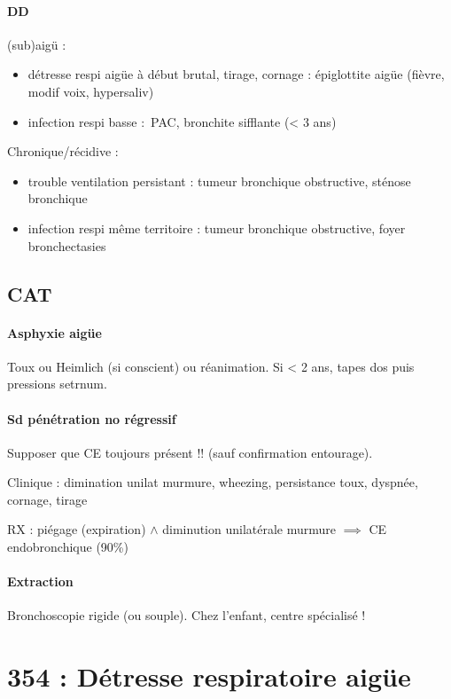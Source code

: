 \documentclass{article}
\begin{document}
\paragraph{DD}
(sub)aigü : 
\begin{itemize}
\item détresse respi aigüe à début brutal, tirage, cornage : épiglottite aigüe
  (fièvre, modif voix, hypersaliv)
\item infection respi basse : PAC, bronchite sifflante (< 3 ans)
\end{itemize}
Chronique/récidive :
\begin{itemize}
\item trouble ventilation persistant : tumeur bronchique obstructive, sténose
  bronchique
\item infection respi même territoire : tumeur bronchique obstructive, foyer
  bronchectasies
\end{itemize}

\subsection{CAT}
\paragraph{Asphyxie aigüe}
Toux ou Heimlich (si conscient) ou réanimation. Si < 2 ans, tapes dos puis
pressions setrnum.
\paragraph{Sd pénétration no régressif}
Supposer que CE toujours présent !! (sauf confirmation entourage). 

Clinique : dimination unilat murmure, wheezing, persistance {toux, dyspnée,
  cornage, tirage}

RX  : piégage (expiration) $\wedge$ diminution unilatérale murmure $\implies$ CE
endobronchique (90\%)

\paragraph{Extraction}
Bronchoscopie rigide (ou souple). Chez l'enfant, centre spécialisé !

\section{354 : Détresse respiratoire aigüe}%
\label{sec:354_detresse_respiratoire_aigue}
\end{document}
